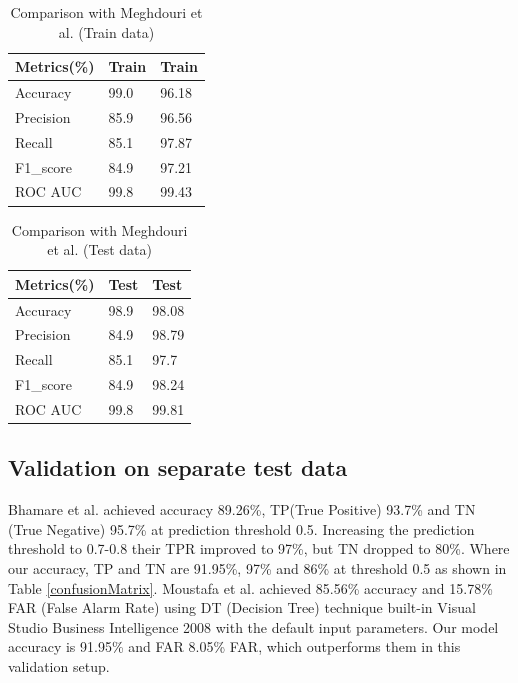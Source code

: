 \documentclass[14pt, conference]{IEEEtran}
\begin{document}

\begin{table}
\normalsize
\centering
\caption{Comparison with Meghdouri et al.\cite{meghdouri2018analysis} (Train data)}
\label{performanceComparisonWithMeghdouriTrain}
\renewcommand{\arraystretch}{1.2}
\begin{tabular}{|C{3cm}|C{2cm}|C{2cm}|}
\hline
\textbf{Metrics(\%)} & \textbf{Train\cite{meghdouri2018analysis}} & \textbf{Train} \\ \hline
Accuracy & 99.0 & 96.18\\ \hline
Precision  & 85.9 & 96.56 \\ \hline
Recall  & 85.1 & 97.87 \\ \hline
F1\_score  & 84.9 & 97.21 \\ \hline
ROC AUC  & 99.8 & 99.43 \\ \hline
\end{tabular}
\end{table}

\begin{table}
\normalsize
\centering
\caption{Comparison with Meghdouri et al.\cite{meghdouri2018analysis} (Test data)}
\label{performanceComparisonWithMeghdouriTest}
\renewcommand{\arraystretch}{1.2}
\begin{tabular}{|C{3cm}|C{2cm}|C{2cm}|}
\hline
\textbf{Metrics(\%)} & \textbf{Test\cite{meghdouri2018analysis}} & \textbf{Test} \\ \hline
Accuracy & 98.9 & 98.08\\ \hline
Precision  & 84.9 &  98.79\\ \hline
Recall & 85.1 & 97.7\\ \hline
F1\_score & 84.9 & 98.24 \\ \hline
ROC AUC   & 99.8& 99.81\\ \hline
\end{tabular}
\end{table}


\subsection{Validation on separate test data}
Bhamare et al. \cite{bhamare2016feasibility} achieved accuracy 89.26\%, TP(True Positive) 93.7\% and TN (True Negative) 95.7\% at prediction threshold 0.5. Increasing the prediction threshold to 0.7-0.8 their TPR improved to 97\%, but TN dropped to 80\%. Where our accuracy, TP and TN are 91.95\%, 97\% and 86\% at threshold 0.5 as shown in Table \ref{confusionMatrix}. Moustafa et al. \cite{moustafa2016evaluation} achieved 85.56\% accuracy and 15.78\% FAR (False Alarm Rate) using DT (Decision Tree) technique built-in Visual Studio Business Intelligence 2008 with the default input parameters. Our model accuracy is 91.95\% and FAR 8.05\% FAR, which outperforms them in this validation setup.
\end{document}
